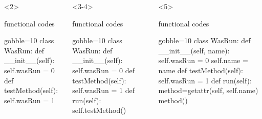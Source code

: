 \documentclass[lualatex]{beamer}
\begin{document}
\begin{frame}[fragile,t]
\begin{columns}[t]
    \begin{onlyenv}<2>
      \begin{block}{functional codes}
        \begin{pythoncode*}{gobble=10}
          class WasRun:
            def __init__(self):
              self.wasRun = 0
            def testMethod(self):
              self.wasRun = 1
        \end{pythoncode*}
      \end{block}
    \end{onlyenv}
    \begin{onlyenv}<3-4>
      \begin{block}{functional codes}
        \begin{pythoncode*}{gobble=10}
          class WasRun:
            def __init__(self):
              self.wasRun = 0
            def testMethod(self):
              self.wasRun = 1
            def run(self):
              self.testMethod()
          \end{pythoncode*}
      \end{block}
    \end{onlyenv}
    \begin{onlyenv}<5>
      \begin{block}{functional codes}
        \begin{pythoncode*}{gobble=10}
          class WasRun:
            def __init__(self, name):
              self.wasRun = 0
              self.name = name
            def testMethod(self):
              self.wasRun = 1
            def run(self):
              method=getattr(self, self.name)
              method()
        \end{pythoncode*}
      \end{block}
    \end{onlyenv}
  \end{columns}        

\end{frame}
\end{document}
